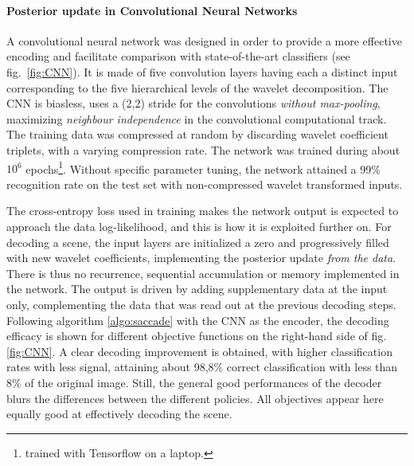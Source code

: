 \documentclass{article}
\begin{document}
\paragraph{Posterior update in Convolutional Neural Networks}
A convolutional neural network was designed in order to provide a more effective encoding and facilitate comparison with state-of-the-art classifiers (see fig.~\ref{fig:CNN}). 
It is made of five convolution layers having each a distinct input corresponding to the five hierarchical levels of the wavelet decomposition. 
The CNN is biasless, uses a (2,2) stride for the convolutions \emph{without max-pooling}, maximizing \emph{neighbour independence} in the convolutional computational track.
The training data was compressed at random by discarding wavelet coefficient triplets, with a varying compression rate. The network was trained during about $10^6$ epochs\footnote{trained with Tensorflow on a laptop.}. Without specific parameter tuning, the network attained a 99\% recognition rate on the test set with non-compressed wavelet transformed inputs. 

The cross-entropy loss used in training makes the network output is expected to approach the data log-likelihood, and this is how it is exploited further on. For decoding a scene, the input layers are initialized a zero  and progressively filled with new wavelet coefficients, implementing the posterior update \emph{from the data}. There is thus no recurrence, sequential accumulation or memory implemented in the network. The output is driven by adding supplementary data at the input only, complementing the data that was read out at the previous decoding steps. 
Following algorithm \ref{algo:saccade} with the CNN as the encoder, the decoding efficacy is shown for different objective functions on the right-hand side of fig.\ref{fig:CNN}. A clear decoding improvement is obtained, with higher classification rates with less signal, attaining about 98,8\% correct classification with less than 8\% of the original image. Still, the general good performances of the decoder blurs the differences between the different policies. All objectives appear here equally good at effectively decoding the scene. 
\end{document}
